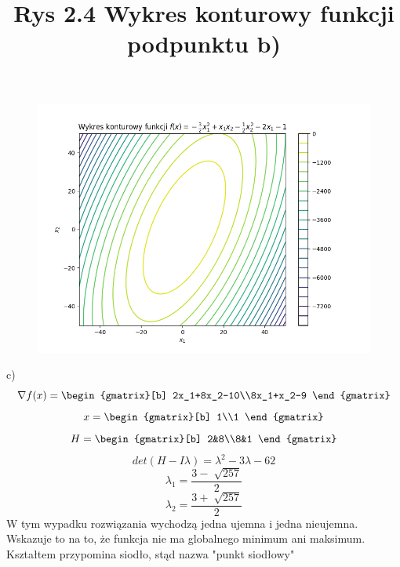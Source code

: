 \documentclass{article}
\begin{document}
\begin{figure}[h]
  \includegraphics[scale=0.5]{Zad2b.png}
  \title{Rys 2.4 Wykres konturowy funkcji podpunktu b)}
  \centering
\end{figure}
\newpage
c)
\begin{equation}
  \nabla f(x) =\begin{gmatrix}[b]
    2x_1+8x_2-10\\8x_1+x_2-9
  \end{gmatrix}
\end{equation}
\begin{equation}
  x=\begin{gmatrix}[b]
    1\\1
  \end{gmatrix}
\end{equation}
\begin{equation}
  H=\begin{gmatrix}[b]
    2&8\\8&1
  \end{gmatrix}
\end{equation}
\begin{equation}
  det(H-I\lambda)=\lambda^2-3\lambda-62
\end{equation}
\begin{equation}
  \lambda_1=\frac{3-\sqrt[]{257}}{2}
\end{equation}
\begin{equation}
  \lambda_2=\frac{3+\sqrt[]{257}}{2}
\end{equation}
W tym wypadku rozwiązania wychodzą jedna ujemna i jedna nieujemna. Wskazuje to na to, że funkcja nie ma globalnego minimum ani maksimum. Kształtem przypomina siodło, stąd nazwa "punkt siodłowy"
\end{document}
